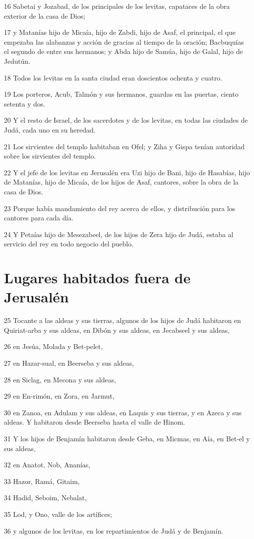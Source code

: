 \par 16 Sabetai y Jozabad, de los principales de los levitas, capataces de la obra exterior de la casa de Dios;
\par 17 y Matanías hijo de Micaía, hijo de Zabdi, hijo de Asaf, el principal, el que empezaba las alabanzas y acción de gracias al tiempo de la oración; Bacbuquías el segundo de entre sus hermanos; y Abda hijo de Samúa, hijo de Galal, hijo de Jedutún.
\par 18 Todos los levitas en la santa ciudad eran doscientos ochenta y cuatro.
\par 19 Los porteros, Acub, Talmón y sus hermanos, guardas en las puertas, ciento setenta y dos. 
\par 20 Y el resto de Israel, de los sacerdotes y de los levitas, en todas las ciudades de Judá, cada uno en su heredad.
\par 21 Los sirvientes del templo habitaban en Ofel; y Ziha y Gispa tenían autoridad sobre los sirvientes del templo.
\par 22 Y el jefe de los levitas en Jerusalén era Uzi hijo de Bani, hijo de Hasabías, hijo de Matanías, hijo de Micaía, de los hijos de Asaf, cantores, sobre la obra de la casa de Dios.
\par 23 Porque había mandamiento del rey acerca de ellos, y distribución para los cantores para cada día.
\par 24 Y Petaías hijo de Mesezabeel, de los hijos de Zera hijo de Judá, estaba al servicio del rey en todo negocio del pueblo.

\section*{Lugares habitados fuera de Jerusalén}

\par 25 Tocante a las aldeas y sus tierras, algunos de los hijos de Judá habitaron en Quiriat-arba y sus aldeas, en Dibón y sus aldeas, en Jecabseel y sus aldeas,
\par 26 en Jesúa, Molada y Bet-pelet,
\par 27 en Hazar-sual, en Beerseba y sus aldeas,
\par 28 en Siclag, en Mecona y sus aldeas,
\par 29 en En-rimón, en Zora, en Jarmut,
\par 30 en Zanoa, en Adulam y sus aldeas, en Laquis y sus tierras, y en Azeca y sus aldeas. Y habitaron desde Beerseba hasta el valle de Hinom.
\par 31 Y los hijos de Benjamín habitaron desde Geba, en Micmas, en Aía, en Bet-el y sus aldeas,
\par 32 en Anatot, Nob, Ananías,
\par 33 Hazor, Ramá, Gitaim,
\par 34 Hadid, Seboim, Nebalat,
\par 35 Lod, y Ono, valle de los artífices;
\par 36 y algunos de los levitas, en los repartimientos de Judá y de Benjamín.

